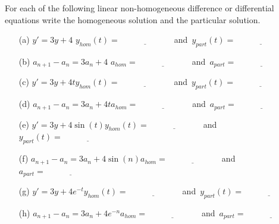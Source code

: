 \begin{problem}\label{prob:undet_coeff}
    For each of the following linear non-homogeneous difference or differential equations
    write the homogeneous solution and the particular solution. 
    \begin{enumerate}
        \item[(a)] $y' = 3y + 4$ \qquad $y_{hom}(t) = \underline{\hspace{1in}}$\, and\, $y_{part}(t) = \underline{\hspace{1in}}$
        \item[(b)] $a_{n+1} - a_n = 3a_n + 4$ \qquad $a_{hom} =
            \underline{\hspace{1in}}$\, and\, $a_{part} = \underline{\hspace{1in}}$
        \item[(c)] $y' = 3y + 4t$\qquad $y_{hom}(t) = \underline{\hspace{1in}}$\, and\, $y_{part}(t) = \underline{\hspace{1in}}$
        \item[(d)] $a_{n+1}-a_n = 3a_n + 4t$\qquad $a_{hom} =
            \underline{\hspace{1in}}$\, and\, $a_{part} = \underline{\hspace{1in}}$
        \item[(e)] $y' = 3y + 4\sin(t)$\qquad $y_{hom}(t) = \underline{\hspace{1in}}$\,
            and\, $y_{part}(t) = \underline{\hspace{1in}}$
        \item[(f)] $a_{n+1} - a_n = 3a_n + 4\sin(n)$\qquad $a_{hom} = \underline{\hspace{1in}}$\,
            and\, $a_{part} = \underline{\hspace{1in}}$
        \item[(g)] $y' = 3y + 4e^{-t}$\qquad $y_{hom}(t) = \underline{\hspace{1in}}$\,
            and\, $y_{part}(t) = \underline{\hspace{1in}}$
        \item[(h)] $a_{n+1} - a_n = 3a_n + 4e^{-n}$\qquad $a_{hom} = \underline{\hspace{1in}}$\,
            and\, $a_{part} = \underline{\hspace{1in}}$
    \end{enumerate}
\end{problem}


